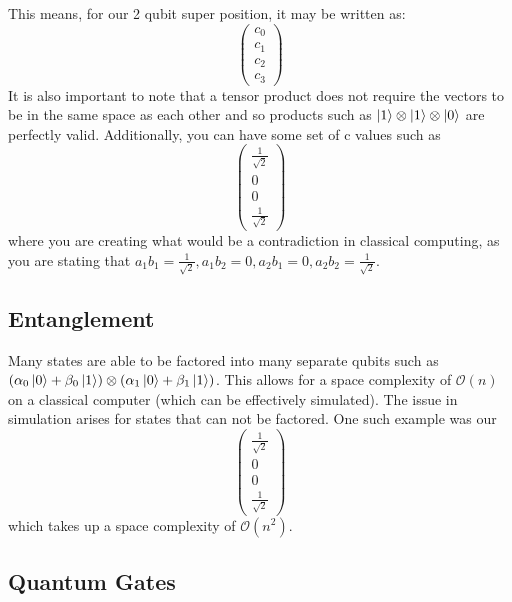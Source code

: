 \documentclass{article}
\begin{document}
This means, for our 2 qubit super position, it may be written as:
\[
    \begin{pmatrix}
        c_0\\
        c_1\\
        c_2\\
        c_3
    \end{pmatrix}
\]
It is also important to note that a tensor product does not require the vectors to be in the same space as each other and so products such as $\ket{1}\otimes\ket{1}\otimes\ket{0}$ are perfectly valid. Additionally, you can have some set of c values such as
\[
    \begin{pmatrix}
        \frac{1}{\sqrt{2}}\\
        0\\
        0\\
        \frac{1}{\sqrt{2}}
    \end{pmatrix}
\]
where you are creating what would be a contradiction in classical computing, as you are stating that $a_1b_1 = \frac{1}{\sqrt{2}}, a_1b_2 = 0, a_2b_1=0, a_2b_2=\frac{1}{\sqrt{2}}$.

\subsection{Entanglement}

Many states are able to be factored into many separate qubits such as $(\alpha_0\ket{0} + \beta_0\ket{1})\otimes(\alpha_1\ket{0} + \beta_1\ket{1})$. This allows for a space complexity of $\mathcal{O}(n)$ on a classical computer (which can be effectively simulated). The issue in simulation arises for states that can not be factored. One such example was our 
\[
    \begin{pmatrix}
        \frac{1}{\sqrt{2}}\\
        0\\
        0\\
        \frac{1}{\sqrt{2}}
    \end{pmatrix}
\]
which takes up a space complexity of $\mathcal{O}(n^2)$.

\subsection{Quantum Gates}
\end{document}
